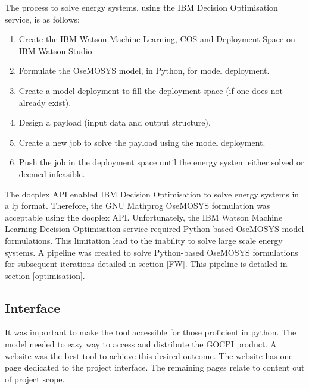 \documentclass[12pt]{article}
\begin{document}
The process to solve energy systems, using the IBM Decision Optimisation service, is as follows:
\begin{enumerate}
	\item Create the IBM Watson Machine Learning, COS and Deployment Space on IBM Watson Studio.
	\item Formulate the OseMOSYS model, in Python, for model deployment.
	\item Create a model deployment to fill the deployment space (if one does not already exist).
	\item Design a payload (input data and output structure).
	\item Create a new job to solve the payload using the model deployment.
	\item Push the job in the deployment space until the energy system either solved or deemed infeasible.
\end{enumerate}

The docplex API enabled IBM Decision Optimisation to solve energy systems in a lp format.
Therefore, the GNU Mathprog OseMOSYS formulation was acceptable using the docplex API. 
Unfortunately, the IBM Watson Machine Learning Decision Optimisation service required Python-based OseMOSYS model formulations.
This limitation lead to the inability to solve large scale energy systems.
A pipeline was created to solve Python-based OseMOSYS formulations for subsequent iterations detailed in section \ref{FW}.
This pipeline is detailed in section \ref{optimisation}.

\subsection{Interface}
It was important to make the tool accessible for those proficient in python.
The model needed to easy way to access and distribute the GOCPI product.
A website was the best tool to achieve this desired outcome.
The website has one page dedicated to the project interface.
The remaining pages relate to content out of project scope.
\end{document}
